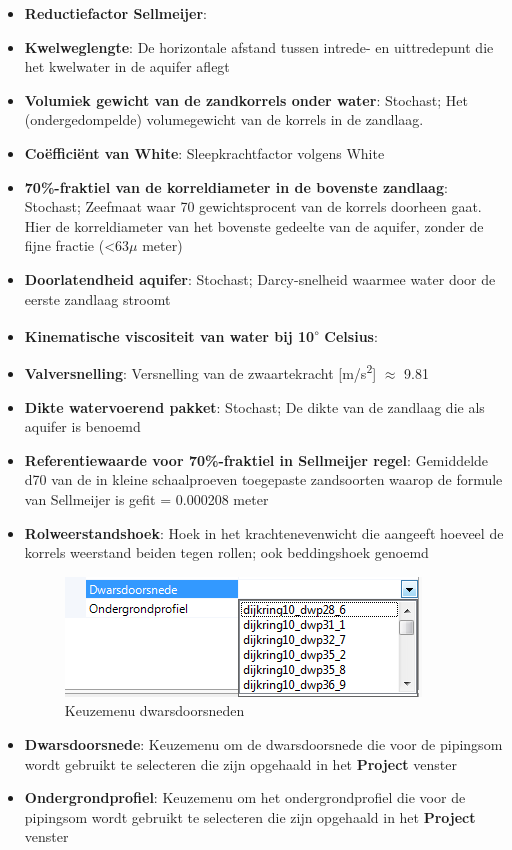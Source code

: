 \begin{enumerate}
\begin{itemize}
	\item \textbf{Reductiefactor Sellmeijer}: 
	\item \textbf{Kwelweglengte}: De horizontale afstand tussen intrede- en uittredepunt die het kwelwater in de aquifer aflegt
	\item \textbf{Volumiek gewicht van de zandkorrels onder water}: Stochast; Het (ondergedompelde) volumegewicht van de korrels in de zandlaag.
	\item \textbf{Co\"{e}ffici\"{e}nt van White}: Sleepkrachtfactor volgens White
	\item \textbf{70\%-fraktiel van de korreldiameter in de bovenste zandlaag}: Stochast; Zeefmaat waar 70 gewichtsprocent van de korrels doorheen gaat. Hier de korreldiameter van het bovenste gedeelte van de aquifer, zonder de fijne fractie (<63$\mu$ meter)
	\item \textbf{Doorlatendheid aquifer}: Stochast; Darcy-snelheid waarmee water door de eerste zandlaag stroomt
	\item \textbf{Kinematische viscositeit van water bij 10\textsuperscript{$\circ$} Celsius}: 
	\item \textbf{Valversnelling}: Versnelling van de zwaartekracht [m/s\textsuperscript{2}] $\approx$ 9.81
	\item \textbf{Dikte watervoerend pakket}: Stochast; De dikte van de zandlaag die als aquifer is benoemd
	\item \textbf{Referentiewaarde voor 70\%-fraktiel in Sellmeijer regel}: Gemiddelde d70 van de in kleine schaalproeven toegepaste zandsoorten waarop de formule van Sellmeijer is gefit = 0.000208 meter
	\item \textbf{Rolweerstandshoek}: Hoek in het krachtenevenwicht die aangeeft hoeveel de korrels weerstand beiden tegen rollen; ook beddingshoek genoemd
	\begin{figure} [H]
	\centering
		\includegraphics{figures/chapter_piping/PipingSurfacelines}
	\caption{Keuzemenu dwarsdoorsneden}
	\label{fig:piping.PipingSurfacelines}
\end{figure}
	\item \textbf{Dwarsdoorsnede}: Keuzemenu om de dwarsdoorsnede die voor de pipingsom wordt gebruikt te selecteren die zijn opgehaald in het \textbf{Project} venster
	\item \textbf{Ondergrondprofiel}: Keuzemenu om het ondergrondprofiel die voor de pipingsom wordt gebruikt te selecteren die zijn opgehaald in het \textbf{Project} venster
	\end{itemize}

\end{enumerate}


